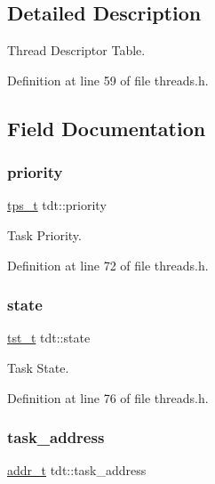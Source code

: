 \subsection{Detailed Description}
Thread Descriptor Table. 

Definition at line 59 of file threads.\+h.



\subsection{Field Documentation}
\mbox{\label{a00076_a1f6b2208cd30a76a918127077652ef40_a1f6b2208cd30a76a918127077652ef40}} 
\subsubsection{\texorpdfstring{priority}{priority}}
{\footnotesize\ttfamily \hyperlink{a00044_a5ee504524d7b79ed81a1ed7b325dc9c6_a5ee504524d7b79ed81a1ed7b325dc9c6}{tps\+\_\+t} tdt\+::priority}



Task Priority. 



Definition at line 72 of file threads.\+h.

\mbox{\label{a00076_ac2427b4d11139de3da5e735a9c1c5299_ac2427b4d11139de3da5e735a9c1c5299}} 
\subsubsection{\texorpdfstring{state}{state}}
{\footnotesize\ttfamily \hyperlink{a00044_a3895f03bb811310833570ff0b8a403d9_a3895f03bb811310833570ff0b8a403d9}{tst\+\_\+t} tdt\+::state}



Task State. 



Definition at line 76 of file threads.\+h.

\mbox{\label{a00076_ad81f2cd346c1134e82393226d2f1852b_ad81f2cd346c1134e82393226d2f1852b}} 
\subsubsection{\texorpdfstring{task\+\_\+address}{task\_address}}
{\footnotesize\ttfamily \hyperlink{a00047_a295f71165288684c38c6bb836fbb3c59_a295f71165288684c38c6bb836fbb3c59}{addr\+\_\+t} tdt\+::task\+\_\+address}



